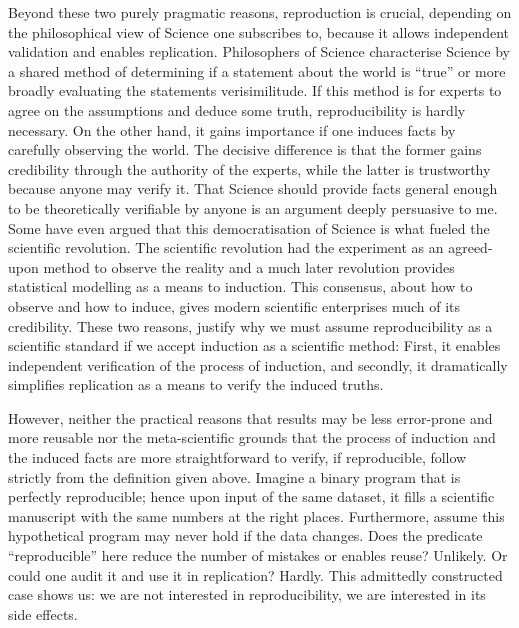 \documentclass[]{book}
\begin{document}
Beyond these two purely pragmatic reasons, reproduction is crucial, depending on the philosophical view of Science one subscribes to, because it allows independent validation and enables replication.
Philosophers of Science characterise Science by a shared method of determining if a statement about the world is ``true'' or more broadly evaluating the statements verisimilitude.
If this method is for experts to agree on the assumptions and deduce some truth, reproducibility is hardly necessary.
On the other hand, it gains importance if one induces facts by carefully observing the world. The decisive difference is that the former gains credibility through the authority of the experts, while the latter is trustworthy because anyone may verify it.
That Science should provide facts general enough to be theoretically verifiable by anyone is an argument deeply persuasive to me.
Some have even argued that this democratisation of Science is what fueled the scientific revolution.
The scientific revolution had the experiment as an agreed-upon method to observe the reality and a much later revolution provides statistical modelling as a means to induction.
This consensus, about how to observe and how to induce, gives modern scientific enterprises much of its credibility.
These two reasons, justify why we must assume reproducibility as a scientific standard if we accept induction as a scientific method:
First, it enables independent verification of the process of induction, and secondly, it dramatically simplifies replication as a means to verify the induced truths.

However, neither the practical reasons that results may be less error-prone and more reusable nor the meta-scientific grounds that the process of induction and the induced facts are more straightforward to verify, if reproducible, follow strictly from the definition given above.
Imagine a binary program that is perfectly reproducible; hence upon input of the same dataset, it fills a scientific manuscript with the same numbers at the right places. Furthermore, assume this hypothetical program may never hold if the data changes.
Does the predicate ``reproducible'' here reduce the number of mistakes or enables reuse? Unlikely.
Or could one audit it and use it in replication? Hardly.
This admittedly constructed case shows us: we are not interested in reproducibility, we are interested in its side effects.
\end{document}
